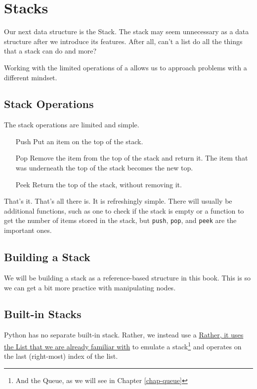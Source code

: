\chapter{Stacks}
Our next data structure is the Stack.
The stack may seem unnecessary as a data structure after we introduce its features.  
After all, can't a list do all the things that a stack can do and more? 

Working with the limited operations of a allows us to approach problems with a different mindset.

\section{Stack Operations}

The stack operations are limited and simple. 


\begin{enumerate}
	\item[Push] Put an item on the top of the stack.
	\item[Pop]  Remove the item from the top of the stack and return it.  The item that was underneath the top of the stack becomes the new top.
	\item[Peek] Return the top of the stack, without removing it.
\end{enumerate}


That's it.  That's all there is.  It is refreshingly simple.
There will usually be additional functions, such as one to check if the stack is empty or a function to get the number of items stored in the stack, but \texttt{push}, \texttt{pop}, and \texttt{peek} are the important ones.




\section{Building a Stack}

We will be building a stack as a reference-based structure in this book.  This is so we can get a bit more practice with manipulating nodes.


	



\section{Built-in Stacks}


Python has no separate built-in stack. Rather, we instead use a  \href{https://docs.python.org/3/tutorial/datastructures.html#using-lists-as-stacks} {Rather, it uses the List that we are already familiar with} to emulate a stack\footnote{And the Queue, as we will see in Chapter \ref{chap-queue}} and operates on the last (right-most) index of the list.

